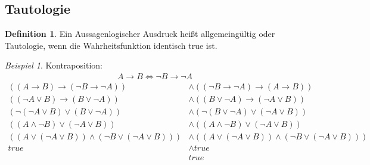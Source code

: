 \documentclass[12pt,a4paper,titlepage]{article} %
\theoremstyle{definition}
\newtheorem{defi}[satz]{Definition}
\theoremstyle{remark}
\newtheorem*{bsp}{Beispiel}
\begin{document}
	\subsection{Tautologie}
	\begin{defi}
		Ein Aussagenlogischer Ausdruck heißt allgemeingültig oder Tautologie, wenn die Wahrheitsfunktion identisch true ist.
	\end{defi}	
	\begin{bsp}
		Kontraposition:\\
		\begin{align*}
			A \rightarrow B \Leftrightarrow \neg B \rightarrow \neg A
		\end{align*}
		\begin{align*}
			((A \rightarrow B) \rightarrow (\neg B \rightarrow \neg A)) &\wedge ((\neg B \rightarrow \neg A) \rightarrow (A \rightarrow B))\\
			((\neg A \vee B) \rightarrow (B \vee \neg A)) &\wedge ((B \vee \neg A) \rightarrow (\neg A \vee B))\\
			(\neg (\neg A \vee B) \vee (B \vee \neg A)) &\wedge (\neg (B \vee \neg A) \vee (\neg A \vee B))\\
			((A \wedge \neg B) \vee (\neg A \vee B)) &\wedge ((A \wedge \neg B) \vee (\neg A \vee B))\\
			((A \vee (\neg A \vee B)) \wedge (\neg B \vee (\neg A \vee B))) &\wedge ((A \vee (\neg A \vee B)) \wedge (\neg B \vee (\neg A \vee B)))\\
			true &\wedge true\\
			&true
		\end{align*}
	\end{bsp}	
\end{document}
